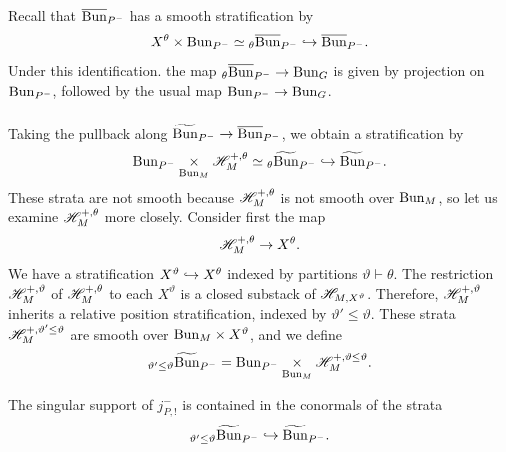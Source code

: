 \subsubsection{} Recall that $\overline{\mathrm{Bun}}_{P^-}$ has a smooth stratification by
  \[X^\theta \times \mathrm{Bun}_{P^-} \simeq {}_\theta\overline{\mathrm{Bun}}_{P^-} \hookrightarrow \overline{\mathrm{Bun}}_{P^-}.\]
Under this identification. the map ${}_\theta\overline{\mathrm{Bun}}_{P^-} \to \mathrm{Bun}_G$ is given by projection on $\mathrm{Bun}_{P^-}$, followed by the usual map $\mathrm{Bun}_{P^-} \to \mathrm{Bun}_G$.

\subsubsection{} Taking the pullback along $\widetilde{\mathrm{Bun}}_{P^-} \to \overline{\mathrm{Bun}}_{P^-}$, we obtain a stratification by
    \[\mathrm{Bun}_{P^-} \underset{\mathrm{Bun}_M}{\times} \mathscr{H}_M^{+, \theta} \simeq  {}_\theta\widetilde{\mathrm{Bun}}_{P^-} \hookrightarrow \widetilde{\mathrm{Bun}}_{P^-}.\]
These strata are not smooth because $\mathscr{H}_M^{+, \theta}$ is not smooth over $\mathrm{Bun}_M$, so let us examine $\mathscr{H}_M^{+, \theta}$ more closely. Consider first the map
    \[\mathscr{H}_M^{+, \theta} \to X^\theta.\]
We have a stratification $X^\vartheta \hookrightarrow X^\theta$ indexed by partitions $\vartheta \vdash \theta$. The restriction $\mathscr{H}_M^{+,\vartheta}$ of $\mathscr{H}_M^{+, \theta}$ to each $X^\vartheta$ is a closed substack of $\mathscr{H}_{M, X^\vartheta}$. Therefore, $\mathscr{H}_M^{+, \vartheta}$ inherits a relative position stratification, indexed by $\vartheta' \le \vartheta$. These strata $\mathscr{H}_M^{+, \vartheta' \le \vartheta}$ are smooth over $\mathrm{Bun}_M \times X^\vartheta$, and we define
    \[
    {}_{\vartheta' \le \vartheta} \widetilde{\mathrm{Bun}}_{P^-} = \mathrm{Bun}_{P^-} \underset{\mathrm{Bun}_M}{\times} \mathscr{H}_M^{+, \vartheta \le \vartheta}.
    \]

\begin{proposition}
\label{proposition:SS_bound}
The singular support of $j_{P,!}^-$ is contained in the conormals of the strata
    \[
    {}_{\vartheta' \le \vartheta} \widetilde{\mathrm{Bun}}_{P^-}
    \hookrightarrow \widetilde{\mathrm{Bun}}_{P^-}.
    \]
\end{proposition}

